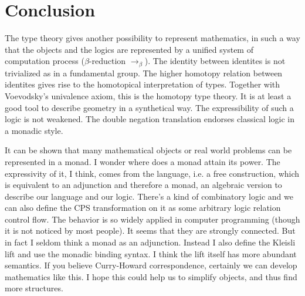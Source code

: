 \chapter*{Conclusion}

The type theory gives another possibility to represent mathematics,
in such a way that the objects and the logics are represented by a
unified system of computation process ($\beta$-reduction $\to_\beta$). 
The identity between identites is not trivialized as in a fundamental
group. The higher homotopy relation between identites gives rise to
the homotopical interpretation of types. Together with Voevodsky's
univalence axiom, this is the homotopy type theory. It is at least a
good tool to describe geometry in a synthetical way. The expressibility
of such a logic is not weakened. The double negation translation
endorses classical logic in a monadic style. 

It can be shown that many mathematical objects or real world problems
can be represented in a monad. I wonder where does a monad attain its
power. The expressivity of it, I think, comes from the language, i.e.
a free construction, which is equivalent to an adjunction and therefore
a monad, an algebraic version to describe our language and our logic. 
There's a kind of combinatory logic and we can also define the CPS
transformation on it as some arbitrary logic relation control flow. 
The behavior is so widely applied in computer programming (though
it is not noticed by most people). It seems that they are strongly
connected. But in fact I seldom think a monad as an adjunction.
Instead I also define the Kleisli lift and use the monadic binding 
syntax. I think the lift itself has more abundant semantics. If you 
believe Curry-Howard correspondence, certainly we can develop mathematics 
like this. I hope this could help us to simplify objects, and thus find 
more structures. 
